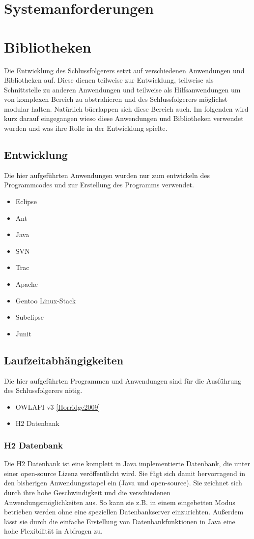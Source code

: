 \section{Systemanforderungen}
\section{Bibliotheken}
Die Entwicklung des Schlussfolgerers setzt auf verschiedenen Anwendungen und Bibliotheken auf. Diese dienen teilweise zur Entwicklung, teilweise als Schnittstelle zu anderen Anwendungen und teilweise als Hilfsanwendungen um von komplexen Bereich zu abstrahieren und des Schlussfolgerers möglichst modular halten. Natürlich büerlappen sich diese Bereich auch. Im folgenden wird kurz darauf eingegangen wieso diese Anwendungen und Bibliotheken verwendet wurden und was ihre Rolle in der Entwicklung spielte.

\subsection{Entwicklung}

Die hier aufgeführten Anwendungen wurden nur zum entwickeln des Programmcodes und zur Erstellung des Programms verwendet.
\begin{itemize}
  \item Eclipse
  \item Ant
  \item Java
  \item SVN
  \item Trac
  \item Apache
  \item Gentoo Linux-Stack
  \item Subclipse
  \item Junit
\end{itemize}

\subsection{Laufzeitabhängigkeiten}
Die hier aufgeführten Programmen und Anwendungen sind für die Ausführung des Schlussfolgerers nötig.
\begin{itemize}
  \item OWLAPI v3 \ref{Horridge2009}
  \item H2 Datenbank
\end{itemize}
 
\subsubsection{H2 Datenbank}
Die H2 Datenbank ist eine komplett in Java implementierte Datenbank, die unter einer open-source Lizenz veröffentlicht wird. Sie fügt sich damit hervorragend in den bisherigen Anwendungsstapel ein (Java und open-source). Sie zeichnet sich durch ihre hohe Geschwindigkeit und die verschiedenen Anwendungsmöglichkeiten aus. So kann sie z.B. in einem eingebetten Modus betrieben werden ohne eine speziellen Datenbankserver einzurichten. Außerdem lässt sie durch die einfache Erstellung von Datenbankfunktionen in Java eine hohe Flexibilität in Abfragen zu.
